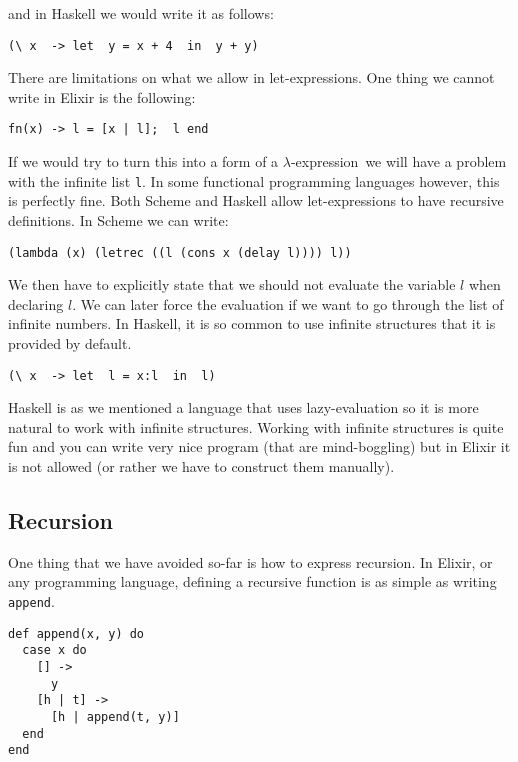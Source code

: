 \documentclass[a4paper,11pt]{article}
\newcommand{\lame}[0]{$\lambda$-expression}
\begin{document}
and in Haskell we would write it as follows:

\begin{verbatim}
(\ x  -> let  y = x + 4  in  y + y)
\end{verbatim}

There are limitations on what we allow in let-expressions. One
thing we cannot write in Elixir is the following:

\begin{verbatim}
fn(x) -> l = [x | l];  l end
\end{verbatim}

If we would try to turn this into a form of a \lame\ we will have a
problem with the infinite list {\tt l}. In some functional
programming languages however, this is perfectly fine. Both Scheme and
Haskell allow let-expressions to have recursive definitions. In Scheme
we can write:

\begin{verbatim}
(lambda (x) (letrec ((l (cons x (delay l)))) l))
\end{verbatim}

We then have to explicitly state that we should not evaluate the
variable $l$ when declaring $l$. We can later force the evaluation if
we want to go through the list of infinite numbers. In Haskell, it is
so common to use infinite structures that it is provided by default.

\begin{verbatim}
(\ x  -> let  l = x:l  in  l)
\end{verbatim}

Haskell is as we mentioned a language that uses lazy-evaluation so it
is more natural to work with infinite structures. Working with
infinite structures is quite fun and you can write very nice program
(that are mind-boggling) but in Elixir it is not allowed (or rather we
have to construct them manually).


\subsection{Recursion}

One thing that we have avoided so-far is how to express recursion. In
Elixir, or any programming language, defining a recursive function is
as simple as writing {\tt append}.

\begin{verbatim}
def append(x, y) do
  case x do
    [] -> 
      y
    [h | t] ->
      [h | append(t, y)]
  end
end
\end{verbatim}
\end{document}
